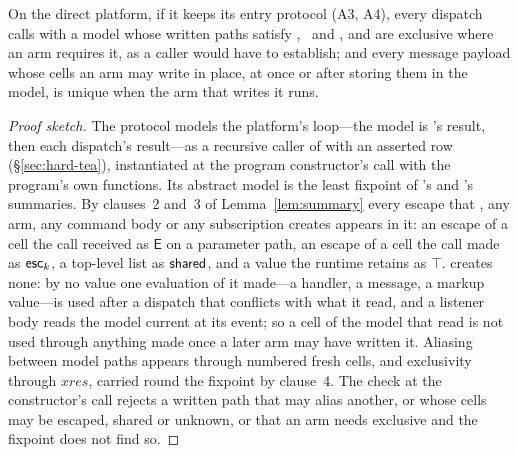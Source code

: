 \begin{lemma}[Entry]
\label{lem:entry}
On the direct platform, if it keeps its entry protocol (A3, A4), every dispatch calls 
with a model whose written paths satisfy \Unescaped, \Dead\ and \Disjoint, and are exclusive where an arm
requires it, as a caller would have to establish; and every message payload whose cells an arm may write
in place, at once or after storing them in the model, is unique when the arm that writes it runs.
\end{lemma}
\begin{proof}[Proof sketch]
The protocol models the platform's loop---the model is 's result, then each dispatch's
result---as a recursive caller of  with an asserted row (\S\ref{sec:hard-tea}), instantiated
at the program constructor's call with the program's own functions. Its abstract model is the least
fixpoint of 's and 's summaries. By clauses~2 and~3 of Lemma~\ref{lem:summary}
every escape that , any arm, any command body or any subscription creates appears in it:
an escape of a cell the call received as $\mathsf{E}$ on a parameter path, an escape of a cell the call
made as $\mathsf{esc}_k$, a top-level list as $\mathsf{shared}$, and a value the runtime retains as $\top$. 
creates none: by  no value one evaluation of it made---a handler, a message, a markup value---is
used after a dispatch that conflicts with what it read, and a listener body reads the model current at
its event; so a cell of the model that  read is not used through anything  made
once a later arm may have written it. Aliasing between model paths appears through numbered fresh cells,
and exclusivity through $\mathit{xres}$, carried round the fixpoint by clause~4. The check at the
constructor's call rejects a written path that may alias another, or whose cells may be escaped, shared
or unknown, or that an arm needs exclusive and the fixpoint does not find so.


\end{proof}
